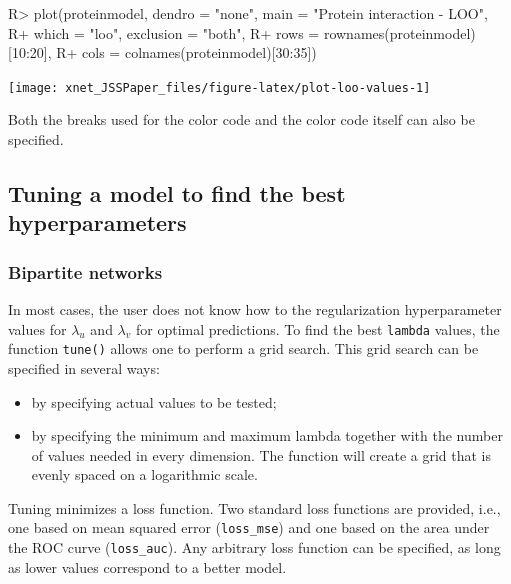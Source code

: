 \documentclass[
]{article}
\providecommand{\tightlist}{%
  \setlength{\itemsep}{0pt}\setlength{\parskip}{0pt}}
\begin{document}
\begin{CodeChunk}

\begin{CodeInput}
R> plot(proteinmodel, dendro = "none", main = "Protein interaction - LOO",
R+      which = "loo", exclusion = "both",
R+      rows = rownames(proteinmodel)[10:20],
R+      cols = colnames(proteinmodel)[30:35])
\end{CodeInput}


\begin{center}\texttt{[image: xnet\_JSSPaper\_files/figure-latex/plot-loo-values-1]} \end{center}

\end{CodeChunk}

Both the breaks used for the color code and the color code itself can
also be specified.

\hypertarget{tuning-a-model-to-find-the-best-hyperparameters}{%
\subsection{Tuning a model to find the best
hyperparameters}\label{tuning-a-model-to-find-the-best-hyperparameters}}

\hypertarget{bipartite-networks-1}{%
\subsubsection{Bipartite networks}\label{bipartite-networks-1}}

In most cases, the user does not know how to the regularization
hyperparameter values for \(\lambda_u\) and \(\lambda_v\) for optimal
predictions. To find the best \texttt{lambda} values, the function
\texttt{tune()} allows one to perform a grid search. This grid search
can be specified in several ways:

\begin{itemize}
\tightlist
\item
  by specifying actual values to be tested;
\item
  by specifying the minimum and maximum lambda together with the number
  of values needed in every dimension. The function will create a grid
  that is evenly spaced on a logarithmic scale.
\end{itemize}

Tuning minimizes a loss function. Two standard loss functions are
provided, i.e., one based on mean squared error (\texttt{loss\_mse}) and
one based on the area under the ROC curve (\texttt{loss\_auc}). Any
arbitrary loss function can be specified, as long as lower values
correspond to a better model.
\end{document}
